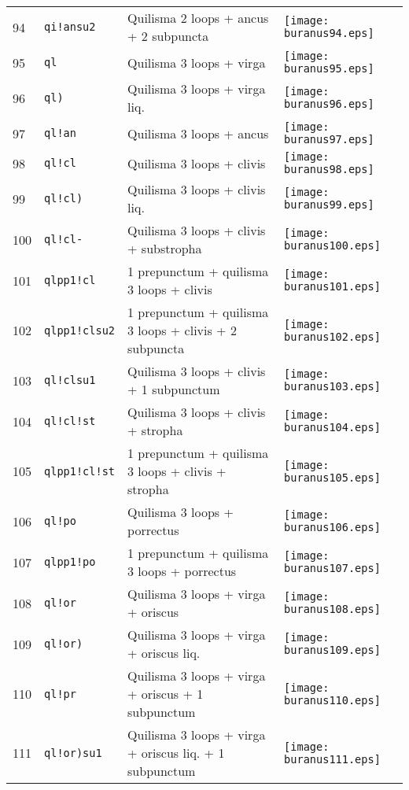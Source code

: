 \documentclass{scrarticle}
\begin{document}
\begin{longtable}{l|l|l|l}
94 & \texttt{qi!ansu2} & Quilisma 2 loops + ancus + 2 subpuncta & \texttt{[image: buranus94.eps]} \\
95 & \texttt{ql} & Quilisma 3 loops + virga & \texttt{[image: buranus95.eps]} \\
96 & \texttt{ql)} & Quilisma 3 loops + virga liq. & \texttt{[image: buranus96.eps]} \\
97 & \texttt{ql!an} & Quilisma 3 loops + ancus & \texttt{[image: buranus97.eps]} \\
98 & \texttt{ql!cl} & Quilisma 3 loops + clivis & \texttt{[image: buranus98.eps]} \\
99 & \texttt{ql!cl)} & Quilisma 3 loops + clivis liq. & \texttt{[image: buranus99.eps]} \\
100 & \texttt{ql!cl-} & Quilisma 3 loops + clivis + substropha & \texttt{[image: buranus100.eps]} \\
101 & \texttt{qlpp1!cl} & 1 prepunctum + quilisma 3 loops + clivis & \texttt{[image: buranus101.eps]} \\
102 & \texttt{qlpp1!clsu2} & 1 prepunctum + quilisma 3 loops + clivis + 2 subpuncta & \texttt{[image: buranus102.eps]} \\
103 & \texttt{ql!clsu1} & Quilisma 3 loops + clivis + 1 subpunctum & \texttt{[image: buranus103.eps]} \\
104 & \texttt{ql!cl!st} & Quilisma 3 loops + clivis + stropha & \texttt{[image: buranus104.eps]} \\
105 & \texttt{qlpp1!cl!st} & 1 prepunctum + quilisma 3 loops + clivis + stropha & \texttt{[image: buranus105.eps]} \\
106 & \texttt{ql!po} & Quilisma 3 loops + porrectus & \texttt{[image: buranus106.eps]} \\
107 & \texttt{qlpp1!po} & 1 prepunctum + quilisma 3 loops + porrectus & \texttt{[image: buranus107.eps]} \\
108 & \texttt{ql!or} & Quilisma 3 loops + virga + oriscus & \texttt{[image: buranus108.eps]} \\
109 & \texttt{ql!or)} & Quilisma 3 loops + virga + oriscus liq. & \texttt{[image: buranus109.eps]} \\
110 & \texttt{ql!pr} & Quilisma 3 loops + virga + oriscus + 1 subpunctum & \texttt{[image: buranus110.eps]} \\
111 & \texttt{ql!or)su1} & Quilisma 3 loops + virga + oriscus liq. + 1 subpunctum & \texttt{[image: buranus111.eps]} \\

\end{longtable}
\end{document}
